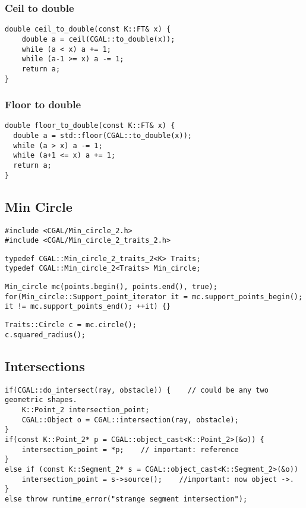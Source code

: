 \documentclass[11pt]{article}
\begin{document}
\subsubsection{Ceil to double}
\begin{lstlisting}
double ceil_to_double(const K::FT& x) {
    double a = ceil(CGAL::to_double(x));
    while (a < x) a += 1;
    while (a-1 >= x) a -= 1;
    return a;
}
\end{lstlisting}

\subsubsection{Floor to double}
\begin{lstlisting}
double floor_to_double(const K::FT& x) {
  double a = std::floor(CGAL::to_double(x));
  while (a > x) a -= 1;
  while (a+1 <= x) a += 1;
  return a;
}
\end{lstlisting}

\subsection{Min Circle}
\begin{lstlisting}
#include <CGAL/Min_circle_2.h>
#include <CGAL/Min_circle_2_traits_2.h>
\end{lstlisting}

\begin{lstlisting}
typedef CGAL::Min_circle_2_traits_2<K> Traits;
typedef CGAL::Min_circle_2<Traits> Min_circle;
\end{lstlisting}

\begin{lstlisting}
Min_circle mc(points.begin(), points.end(), true);
for(Min_circle::Support_point_iterator it = mc.support_points_begin(); it != mc.support_points_end(); ++it) {}
\end{lstlisting}

\begin{lstlisting}
Traits::Circle c = mc.circle();
c.squared_radius();
\end{lstlisting}

\subsection{Intersections}
\begin{lstlisting}
if(CGAL::do_intersect(ray, obstacle)) {    // could be any two geometric shapes.
    K::Point_2 intersection_point;
	CGAL::Object o = CGAL::intersection(ray, obstacle);
}	
if(const K::Point_2* p = CGAL::object_cast<K::Point_2>(&o)) {
    intersection_point = *p;    // important: reference
}
else if (const K::Segment_2* s = CGAL::object_cast<K::Segment_2>(&o))
    intersection_point = s->source();    //important: now object ->.
}
else throw runtime_error("strange segment intersection");
\end{lstlisting}
\end{document}
